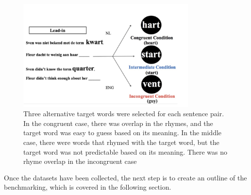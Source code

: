 \begin{enumerate}
\begin{figure}
    \centering
     \includegraphics[width=0.80\textwidth]{figures/Mantegna.png}  
    
    \caption{Three alternative target words were selected for each sentence pair. In the congruent case, there was overlap in the rhymes, and the target word was easy to guess based on its meaning. In the middle case, there were words that rhymed with the target word, but the target word was not predictable based on its meaning. There was no rhyme overlap in the incongruent case \cite{mantegna2019distinguishing}}
    \label{fig: Mantegna}
    
    
\end{figure}

\end{enumerate}
Once the datasets have been collected, the next step is to create an outline of the benchmarking, which is covered in the following section.  

